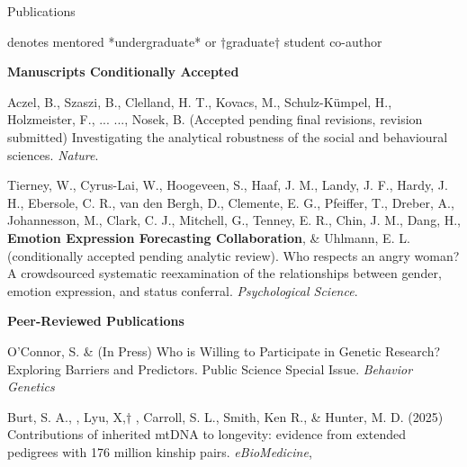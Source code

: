 \begin{rSection}{\textrm{Publications}}%
\vspace{-1mm}\begin{center}\footnotesize{denotes mentored *undergraduate* or $\dagger$graduate$\dagger$ student co-author}\end{center}\vspace{-1mm}

{\large \textbf{Manuscripts Conditionally Accepted}}
\begin{etaremune}
\item Aczel, B., Szaszi, B., Clelland, H. T., Kovacs, M., Schulz-Kümpel, H., Holzmeister, F., ... \meb ..., Nosek, B. (Accepted pending final revisions, revision submitted) Investigating the analytical robustness of the social and behavioural sciences. \textit{Nature}.
\item Tierney, W., Cyrus-Lai, W., Hoogeveen, S., Haaf, J. M., Landy, J. F., Hardy, J. H., Ebersole, C. R., van den Bergh, D., Clemente, E. G., Pfeiffer, T., Dreber, A., Johannesson, M., Clark, C. J., Mitchell, G., Tenney, E. R., Chin, J. M., Dang, H., \textbf{Emotion Expression Forecasting Collaboration}, \& Uhlmann, E. L. (conditionally accepted pending analytic review). Who respects an angry woman? A crowdsourced systematic reexamination of the relationships between gender, emotion expression, and status conferral. \textit{Psychological Science}.
\end{etaremune}

{\large \textbf{Peer-Reviewed Publications}}

\begin{etaremune}

\item O'Connor, S. \& \meb (In Press) Who is Willing to Participate in Genetic Research? Exploring Barriers and Predictors. Public Science Special Issue. \textit{Behavior Genetics}

\item Burt, S. A., \meb, Lyu, X,$\dagger$ \joe, Carroll, S. L., Smith, Ken R., \& Hunter, M. D. (2025) Contributions of inherited mtDNA to longevity: evidence from extended pedigrees with 176 million kinship pairs. \textit{eBioMedicine},  %


\end{etaremune}
\end{rSection}
